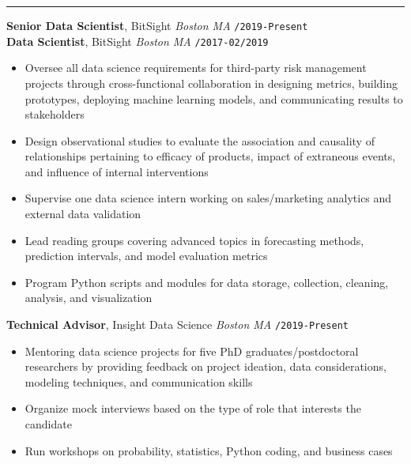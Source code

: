 \documentclass[10pt,english]{report}
\begin{document}
\vspace{5mm}

{\par}
\vspace{1mm}\hrule
\vspace{1mm}

\textbf{Senior Data Scientist}, BitSight \hfill \textit{Boston MA} \texttt{/2019-Present} \\
\textbf{Data Scientist}, BitSight \hfill \textit{Boston MA} \texttt{/2017-02/2019}
\begin{itemize}
\item Oversee all data science requirements for third-party risk management projects through cross-functional collaboration in designing metrics, building prototypes, deploying machine learning models, and communicating results to stakeholders
\item Design observational studies to evaluate the association and causality of relationships pertaining to efficacy of products, impact of extraneous events, and influence of internal interventions
\item Supervise one data science intern working on sales/marketing analytics and external data validation
\item Lead reading groups covering advanced topics in forecasting methods, prediction intervals, and model evaluation metrics
\item Program Python scripts and modules for data storage, collection, cleaning, analysis, and visualization
\end{itemize}

\vspace{1mm}

\textbf{Technical Advisor}, Insight Data Science \hfill \textit{Boston MA} \texttt{/2019-Present}
\begin{itemize}
\item Mentoring data science projects for five PhD graduates/postdoctoral researchers by providing feedback on project ideation, data considerations, modeling techniques, and communication skills
\item Organize mock interviews based on the type of role that interests the candidate
\item Run workshops on probability, statistics, Python coding, and business cases
\end{itemize}
\end{document}
